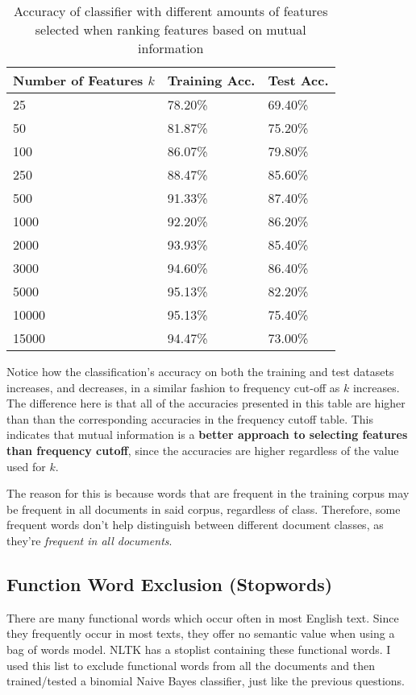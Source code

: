 \documentclass{article}
\begin{document}
\begin{table}
	\centering
	\begin{tabular}{|l|l|l|}
	\hline
	\textbf{Number of Features $k$} & \textbf{Training Acc.} & \textbf{Test Acc.} \\
	\hline
	25 & 78.20\% & 69.40\% \\
	50 & 81.87\% & 75.20\% \\
	100 & 86.07\% & 79.80\% \\
	250 & 88.47\% & 85.60\% \\
	500 & 91.33\% & 87.40\% \\
	1000 & 92.20\% & 86.20\% \\
	2000 & 93.93\% & 85.40\% \\
	3000 & 94.60\% & 86.40\% \\
	5000 & 95.13\% & 82.20\% \\
	10000 & 95.13\% & 75.40\% \\
	15000 & 94.47\% & 73.00\% \\
	\hline
	\end{tabular}
	\caption{Accuracy of classifier with different amounts of features selected when ranking features based on mutual information}
	\label{tab:mutual_information}
\end{table}

Notice how the classification's accuracy on both the training and test datasets increases, and decreases, in a similar fashion to frequency cut-off as $k$ increases. The difference here is that all of the accuracies presented in this table are higher than than the corresponding accuracies in the frequency cutoff table. This indicates that mutual information is a \textbf{better approach to selecting features than frequency cutoff}, since the accuracies are higher regardless of the value used for $k$.

The reason for this is because words that are frequent in the training corpus may be frequent in all documents in said corpus, regardless of class. Therefore, some frequent words don't help distinguish between different document classes, as they're \textit{frequent in all documents}.

\subsection{Function Word Exclusion (Stopwords)}

There are many functional words which occur often in most English text. Since they frequently occur in most texts, they offer no semantic value when using a bag of words model. NLTK has a stoplist containing these functional words. I used this list to exclude functional words from all the documents and then trained/tested a binomial Naive Bayes classifier, just like the previous questions.
\end{document}
